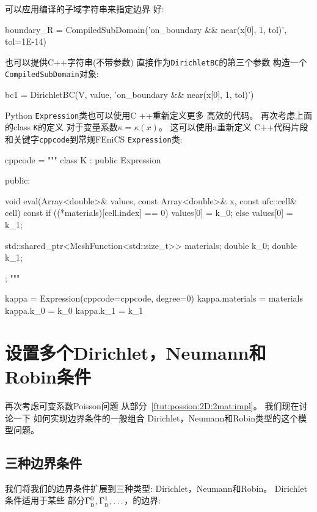 可以应用编译的子域字符串来指定边界
好:

\begin{python}
boundary_R = CompiledSubDomain('on_boundary && near(x[0], 1, tol)',
                               tol=1E-14)
\end{python}

也可以提供C++字符串(不带参数)
直接作为\texttt{DirichletBC}的第三个参数
构造一个\texttt{CompiledSubDomain}对象:

\begin{python}
bc1 = DirichletBC(V, value, 'on_boundary && near(x[0], 1, tol)')
\end{python}

Python \texttt{Expression}类也可以使用C ++重新定义更多
高效的代码。 再次考虑上面的class \texttt{K}的定义
对于变量系数$\kappa = \kappa(x)$。 这可以使用a重新定义
C++代码片段和关键字\texttt{cppcode}到常规FEniCS
\texttt{Expression}类:

\begin{python}
cppcode = """
class K : public Expression
{
public:

  void eval(Array<double>& values,
            const Array<double>& x,
            const ufc::cell& cell) const
  {
    if ((*materials)[cell.index] == 0)
      values[0] = k_0;
    else
      values[0] = k_1;
  }

  std::shared_ptr<MeshFunction<std::size_t>> materials;
  double k_0;
  double k_1;

};
"""

kappa = Expression(cppcode=cppcode, degree=0)
kappa.materials = materials
kappa.k_0 = k_0
kappa.k_1 = k_1
\end{python}

\section{设置多个Dirichlet，Neumann和Robin条件}
\label{ch:poisson0:multi:bc}

再次考虑可变系数Poisson问题
从部分~\ref{ftut:possion:2D:2mat:impl}。 我们现在讨论一下
如何实现边界条件的一般组合
Dirichlet，Neumann和Robin类型的这个模型问题。

\subsection{三种边界条件}

我们将我们的边界条件扩展到三种类型:
Dirichlet，Neumann和Robin。 Dirichlet条件适用于某些
部分$\Gamma_{_\mathrm{D}}^0, \Gamma_{_\mathrm{D}}^1,\ldots$，的边界:

